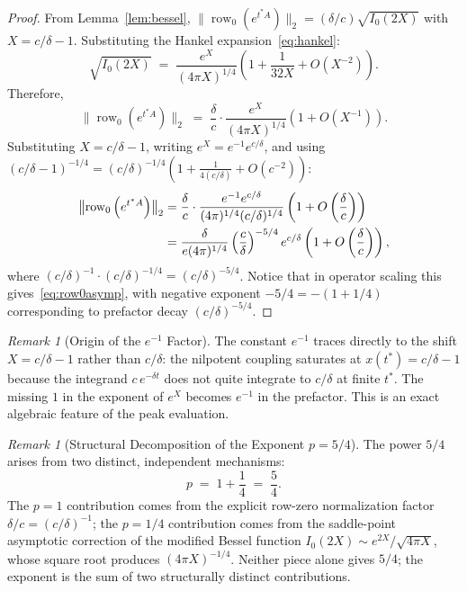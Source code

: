 \documentclass[11pt,reqno]{article}
\theoremstyle{plain}
\theoremstyle{definition}
\theoremstyle{remark}
\newtheorem{remark}[theorem]{Remark}
\numberwithin{equation}{section}
\begin{document}
\begin{proof}
From Lemma~\ref{lem:bessel}, $\|\operatorname{row}_0(e^{t^*A})\|_2 = (\delta/c)\sqrt{I_0(2X)}$ with $X = c/\delta - 1$. Substituting the Hankel expansion~\eqref{eq:hankel}:
\begin{equation}\label{eq:sqrtI0}
  \sqrt{I_0(2X)} \;=\; \frac{e^X}{(4\pi X)^{1/4}} \left(1 + \frac{1}{32X} + O(X^{-2})\right).
\end{equation}
Therefore,
\begin{equation}\label{eq:row0step}
  \bigl\|\operatorname{row}_0\left(e^{t^*A}\right)\bigr\|_2 \;=\; \frac{\delta}{c} \cdot \frac{e^X}{(4\pi X)^{1/4}} \left(1 + O(X^{-1})\right).
\end{equation}
Substituting $X = c/\delta - 1$, writing $e^X = e^{-1}e^{c/\delta}$, and using $(c/\delta - 1)^{-1/4} = (c/\delta)^{-1/4}(1 + \frac{1}{4(c/\delta)} + O(c^{-2}))$:
\begin{align}
  \bigl\|\operatorname{row}_0\left(e^{t^*A}\right)\bigr\|_2 &= \frac{\delta}{c} \cdot \frac{e^{-1}e^{c/\delta}}{(4\pi)^{1/4}(c/\delta)^{1/4}} \left(1 + O\left(\frac{\delta}{c}\right)\right) \notag\\
  &= \frac{\delta}{e(4\pi)^{1/4}} \left(\frac{c}{\delta}\right)^{-5/4} e^{c/\delta} \left(1 + O\left(\frac{\delta}{c}\right)\right), \label{eq:row0final}
\end{align}
where $(c/\delta)^{-1} \cdot (c/\delta)^{-1/4} = (c/\delta)^{-5/4}$. Notice that in operator scaling this gives~\eqref{eq:row0asymp}, with negative exponent $-5/4 = -(1 + 1/4)$ corresponding to prefactor decay $(c/\delta)^{-5/4}$.
\end{proof}

\begin{remark}[Origin of the $e^{-1}$ Factor]\label{rem:einv}
The constant $e^{-1}$ traces directly to the shift $X = c/\delta - 1$ rather than $c/\delta$: the nilpotent coupling saturates at $x(t^*) = c/\delta - 1$ because the integrand $c\,e^{-\delta t}$ does not quite integrate to $c/\delta$ at finite $t^*$. The missing $1$ in the exponent of $e^X$ becomes $e^{-1}$ in the prefactor. This is an exact algebraic feature of the peak evaluation.
\end{remark}

\begin{remark}[Structural Decomposition of the Exponent $p = 5/4$]\label{rem:54origin}
The power $5/4$ arises from two distinct, independent mechanisms:
\begin{equation}\label{eq:p_decomposition}
  p \;=\; 1 + \frac{1}{4} \;=\; \frac{5}{4}.
\end{equation}
The $p = 1$ contribution comes from the explicit row-zero normalization factor $\delta/c = (c/\delta)^{-1}$; the $p = 1/4$ contribution comes from the saddle-point asymptotic correction of the modified Bessel function $I_0(2X) \sim e^{2X}/\sqrt{4\pi X}$, whose square root produces $(4\pi X)^{-1/4}$. Neither piece alone gives $5/4$; the exponent is the sum of two structurally distinct contributions.
\end{remark}
\end{document}
